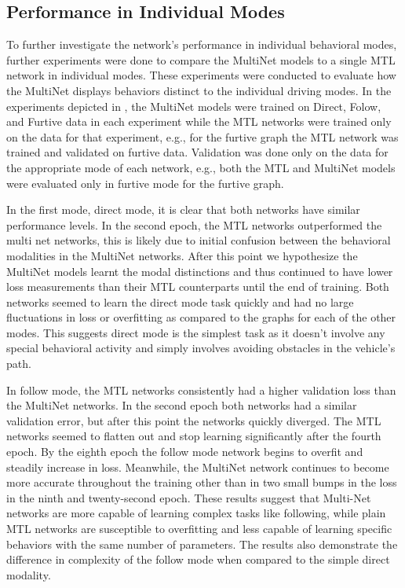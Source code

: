 \subsection{Performance in Individual Modes}
\label{resultspt2}
To further investigate the network's performance in individual behavioral modes, further experiments were done to compare the MultiNet models to a single MTL network in individual modes. These experiments were conducted to evaluate how the MultiNet displays behaviors distinct to the individual driving modes. In the experiments depicted in , the MultiNet models were trained on Direct, Folow, and Furtive data in each experiment while the MTL networks were trained only on the data for that experiment, e.g., for the furtive graph the MTL network was trained and validated on furtive data. Validation was done only on the data for the appropriate mode of each network, e.g., both the MTL and MultiNet models were evaluated only in furtive mode for the furtive graph.

In the first mode, direct mode, it is clear that both networks have similar performance levels. In the second epoch, the MTL networks outperformed the multi net networks, this is likely due to initial confusion between the behavioral modalities in the MultiNet networks. After this point we hypothesize the MultiNet models learnt the modal distinctions and thus continued to have lower loss measurements than their MTL counterparts until the end of training. Both networks seemed to learn the direct mode task quickly and had no large fluctuations in loss or overfitting as compared to the graphs for each of the other modes. This suggests direct mode is the simplest task as it doesn't involve any special behavioral activity and simply involves avoiding obstacles in the vehicle's path. 

In follow mode, the MTL networks consistently had a higher validation loss than the MultiNet networks. In the second epoch both networks had a similar validation error, but after this point the networks quickly diverged. The MTL networks seemed to flatten out and stop learning significantly after the fourth epoch. By the eighth epoch the follow mode network begins to overfit and steadily increase in loss. Meanwhile, the MultiNet network continues to become more accurate throughout the training other than in two small bumps in the loss in the ninth and twenty-second epoch. These results suggest that Multi-Net networks are more capable of learning complex tasks like following, while plain MTL networks are susceptible to overfitting and less capable of learning specific behaviors with the same number of parameters. The results also demonstrate the difference in complexity of the follow mode when compared to the simple direct modality.

